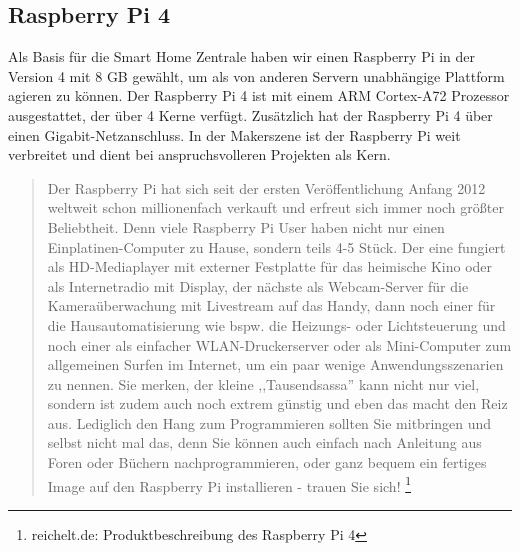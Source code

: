 \subsection{Raspberry Pi 4}\label{hw_raspberrypi}
Als Basis für die Smart Home Zentrale haben wir einen Raspberry Pi in der Version 4 mit 8 GB gewählt, um als von anderen Servern unabhängige Plattform agieren zu können. 
Der Raspberry Pi 4 ist mit einem ARM Cortex-A72 Prozessor ausgestattet, der über 4 Kerne verfügt.
Zusätzlich hat der Raspberry Pi 4 über einen Gigabit-Netzanschluss.
In der Makerszene ist der Raspberry Pi weit verbreitet und dient bei anspruchsvolleren Projekten als Kern.\par
\begin{quote}
 		\color{quotetext}
 		Der Raspberry Pi hat sich seit der ersten Veröffentlichung Anfang 2012 weltweit schon millionenfach verkauft und erfreut sich immer noch größter Beliebtheit. Denn viele Raspberry Pi User haben nicht nur einen Einplatinen-Computer zu Hause, sondern teils 4-5 Stück.
Der eine fungiert als HD-Mediaplayer mit externer Festplatte für das heimische Kino oder als Internetradio mit Display, der nächste als Webcam-Server für die Kameraüberwachung mit Livestream auf das Handy, dann noch einer für die Hausautomatisierung wie bspw. die Heizungs- oder Lichtsteuerung und noch einer als einfacher WLAN-Druckerserver oder als Mini-Computer zum allgemeinen Surfen im Internet, um ein paar wenige Anwendungsszenarien zu nennen.
Sie merken, der kleine ,,Tausendsassa'' kann nicht nur viel, sondern ist zudem auch noch extrem günstig und eben das macht den Reiz aus. Lediglich den Hang zum Programmieren sollten Sie mitbringen und selbst nicht mal das, denn Sie können auch einfach nach Anleitung aus Foren oder Büchern nachprogrammieren, oder ganz bequem ein fertiges Image auf den Raspberry Pi installieren - trauen Sie sich! 
\footnote{reichelt.de: Produktbeschreibung des Raspberry Pi 4}
\end{quote}
\newpage